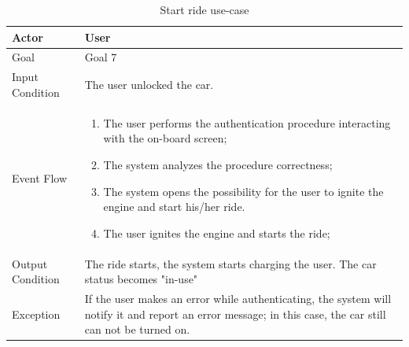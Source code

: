 \begin{table}[H]
\begin{center}
\begin{tabular}{p{} | p{}}
\hline
Actor & User\\
\hline
Goal & Goal 7\\
\hline
Input Condition & The user unlocked the car.\\
\hline
Event Flow & 
\begin{enumerate}
\item The user performs the authentication procedure interacting with the on-board screen;
\item The system analyzes the procedure correctness;
\item The system opens the possibility for the user to ignite the engine and start his/her ride.
\item The user ignites the engine and starts the ride;
\end{enumerate} \\
\hline
Output Condition & The ride starts, the system starts charging the user. The car status becomes "in-use"\\
\hline
Exception & If the user makes an error while authenticating, the system will notify it and report an error message; in this case, the car still can not be turned on.\\
\hline
\end{tabular}
\end{center}
\caption{Start ride use-case}
\label{start_ride_uc}
\end{table}